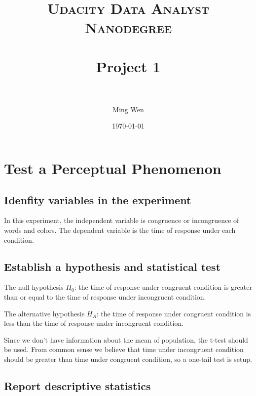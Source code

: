 \documentclass[paper=a4, fontsize=11pt]{scrartcl} %
\title{	
\normalfont \normalsize 
\textsc{Udacity Data Analyst Nanodegree} \\ [25pt] %
\horrule{0.5pt} \\[0.4cm] %
\LARGE{Project 1} \\ %
\horrule{0.5pt} \\[0.5cm] %
}
\author{Ming Wen} %
\date{\normalsize\today} %
\numberwithin{equation}{section} %
\numberwithin{figure}{section} %
\numberwithin{table}{section} %
\begin{document}
\maketitle %


\section{Test a Perceptual Phenomenon}

\subsection{Idenfity variables in the experiment}
\medskip
\noindent{}
\medskip

In this experiment, the independent variable is congruence or
incongruence of words and colors. The dependent variable is
the time of response under each condition.

\subsection{Establish a hypothesis and statistical test}
\medskip
\noindent{}
\medskip

The null hypothesis $H_0$: the time of response under congruent
condition is greater than or equal to the time of response under
incongruent condition.

The alternative hypothesis $H_A$: the time of response under congruent
condition is less than the time of response under incongruent condition.

Since we don't have information about the mean of population, the t-test
should be used. From common sense we believe that time under
incongruent condition should be greater than time under
congruent condition, so a one-tail test is setup.

\subsection{Report descriptive statistics}
\medskip
\noindent{}
\medskip
\end{document}
